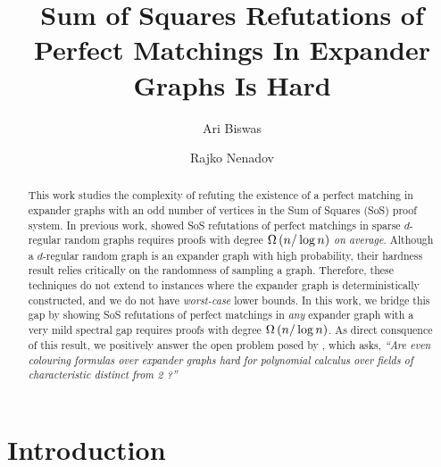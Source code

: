\documentclass[11pt]{article}
\title{Sum of Squares Refutations of Perfect Matchings In Expander Graphs Is Hard}
\author[1]{Ari Biswas}
\author[2]{Rajko Nenadov}
\affil[1]{\small University Of Warwick, United Kingdom}
\affil[2]{\small University Of Auckland, New Zealand}
\date{}
\begin{document}
\maketitle
\begin{abstract}
This work studies the complexity of refuting the existence of a perfect matching in expander graphs with an odd number of vertices in the Sum of Squares (SoS) proof system.
In previous work, \citet{Austrin_2022} showed  SoS refutations of perfect matchings in sparse $d$-regular random graphs requires proofs with degree $\Omega\left(n/\log n\right)$ \emph{on average}.
Although a $d$-regular random graph is an expander graph with high probability, their hardness result relies critically on the randomness of sampling a graph.
Therefore, these techniques do not extend to instances where the expander graph is deterministically constructed, and we do not have  \emph{worst-case} lower bounds.
In this work, we bridge this gap by showing SoS refutations of perfect matchings in \emph{any} expander graph with a very mild spectral gap requires proofs with degree $\Omega\left(n/\log n\right)$.
As direct consquence of this result, we positively answer the open problem posed by \citet[Open Problem 7.7]{buss2021proof}, which asks, \textit{``Are even colouring formulas over expander graphs hard for polynomial calculus over fields of characteristic distinct from 2 ?''}
\end{abstract}

\section{Introduction}
\end{document}
